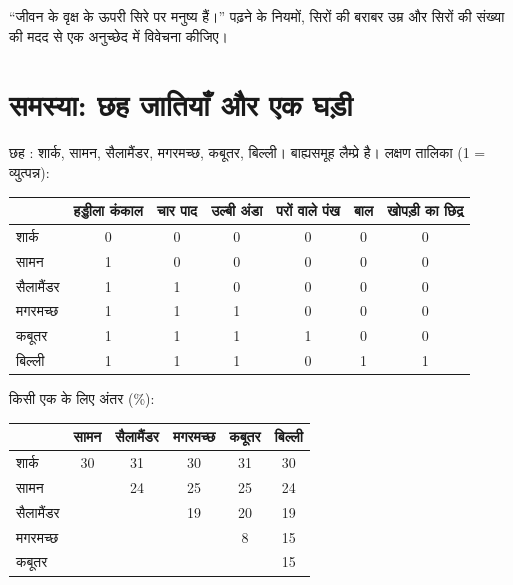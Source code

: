 \begin{exercise}[$\star\star\star$]\label{exo:g12:phylogenetic-trees:15}
``जीवन के वृक्ष के ऊपरी सिरे पर मनुष्य हैं।'' पढ़ने के नियमों, सिरों की
बराबर उम्र और सिरों की संख्या की मदद से एक अनुच्छेद में विवेचना कीजिए।
\end{exercise}

\section{समस्या: छह जातियाँ और एक घड़ी}

\begin{problem}
\label{pb:g12:phylogenetic-trees:1}
छह : शार्क, सामन, सैलामैंडर, मगरमच्छ, कबूतर, बिल्ली। बाह्यसमूह
लैम्प्रे है। लक्षण तालिका (1 = व्युत्पन्न):

\begin{center}
\small
\begin{tabular}{lcccccc}
 & हड्डीला कंकाल & चार पाद & उल्बी अंडा & परों वाले पंख & बाल & खोपड़ी का छिद्र \\ \hline
शार्क & 0 & 0 & 0 & 0 & 0 & 0 \\
सामन & 1 & 0 & 0 & 0 & 0 & 0 \\
सैलामैंडर & 1 & 1 & 0 & 0 & 0 & 0 \\
मगरमच्छ & 1 & 1 & 1 & 0 & 0 & 0 \\
कबूतर & 1 & 1 & 1 & 1 & 0 & 0 \\
बिल्ली & 1 & 1 & 1 & 0 & 1 & 1 \\
\end{tabular}
\end{center}

किसी एक  के लिए  अंतर (\%):

\begin{center}
\begin{tabular}{lccccc}
 & सामन & सैलामैंडर & मगरमच्छ & कबूतर & बिल्ली \\ \hline
शार्क & 30 & 31 & 30 & 31 & 30 \\
सामन & & 24 & 25 & 25 & 24 \\
सैलामैंडर & & & 19 & 20 & 19 \\
मगरमच्छ & & & & 8 & 15 \\
कबूतर & & & & & 15 \\
\end{tabular}
\end{center}


\end{problem}
